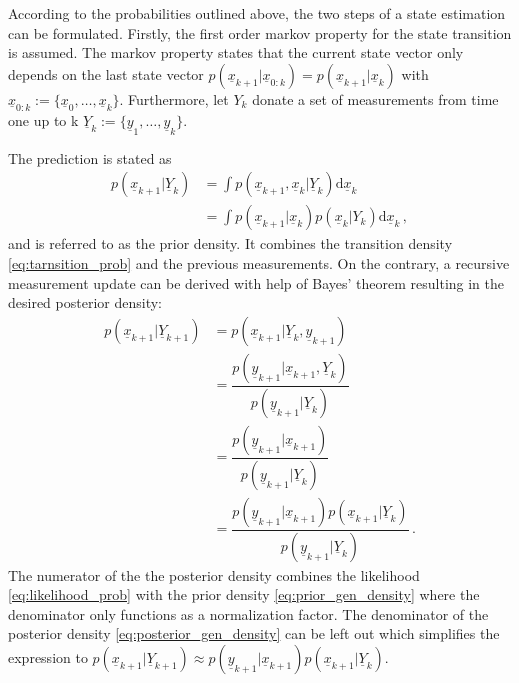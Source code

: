 \documentclass[a4paper]{IEEEtran}
\begin{document}
According to the probabilities outlined above, the two steps of a state estimation can be formulated. 
Firstly, the first order markov property for the state transition is assumed. The markov property states that the current state vector only depends on the last state vector 
$p(\underline{x}_{k+1} \vert \underline{x}_{0:k}) = p(\underline{x}_{k+1} \vert \underline{x}_{k})$ with $\underline{x}_{0:k} := \{\underline{x}_{0}, \dotsc, \underline{x}_{k}\}$.
Furthermore, let $Y_{k}$ donate a set of measurements from time one up to k $\underline{Y}_{k} := \{\underline{y}_{1}, \dotsc , \underline{y}_{k}\}$.

The prediction is stated as
\begin{equation}
    \begin{split}
        p(\underline{x}_{k+1} \vert \underline{Y}_{k}) &= \int p(\underline{x}_{k+1}, \underline{x}_{k} \vert \underline{Y}_{k}) \mathrm{d}\underline{x}_{k} \\
        &= \int p(\underline{x}_{k+1} \vert \underline{x}_{k})p(\underline{x}_{k} \vert Y_{k})\mathrm{d}\underline{x}_{k} \,,
    \end{split}
    \label{eq:prior_gen_density}
\end{equation}
and is referred to as the prior density. It combines the transition density \eqref{eq:tarnsition_prob} and the previous measurements.
On the contrary, a recursive measurement update can be derived with help of Bayes' theorem resulting in the desired posterior density:
\begin{equation}
    \begin{split}
        p(\underline{x}_{k+1} \vert \underline{Y}_{k+1}) &= p(\underline{x}_{k+1} \vert \underline{Y}_{k}, \underline{y}_{k+1}) \\
        &= \dfrac{p(\underline{y}_{k+1} \vert \underline{x}_{k+1}, \underline{Y}_{k})}{p(\underline{y}_{k+1} \vert \underline{Y}_{k})} \\
        &= \dfrac{p(\underline{y}_{k+1} \vert \underline{x}_{k+1})}{p(\underline{y}_{k+1} \vert \underline{Y}_{k})} \\
        &= \dfrac{p(\underline{y}_{k+1} \vert \underline{x}_{k+1}) p(\underline{x}_{k+1} \vert \underline{Y}_{k})}{p(\underline{y}_{k+1} \vert \underline{Y}_{k})} \,.  
        \label{eq:posterior_gen_density}
    \end{split}
\end{equation}
The numerator of the the posterior density combines the likelihood \eqref{eq:likelihood_prob} with the 
prior density \eqref{eq:prior_gen_density} where the denominator only functions as a normalization factor.
The denominator of the posterior density \eqref{eq:posterior_gen_density} can be left out which simplifies the expression to 
$ p(\underline{x}_{k+1} \vert \underline{Y}_{k+1}) \approx p(\underline{y}_{k+1} \vert \underline{x}_{k+1}) p(\underline{x}_{k+1} \vert \underline{Y}_{k})$.
\end{document}
